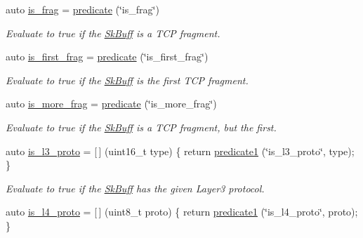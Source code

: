 \begin{DoxyCompactItemize}
auto \hyperlink{namespacepfq_1_1lang_1_1anonymous__namespace_02default_8hpp_03_af042e092c925ae6306ae85ae5a56563d}{is\+\_\+frag} = \hyperlink{namespacepfq_1_1lang_a6c156f209614d0291b280153416dba97}{predicate} (\char`\"{}is\+\_\+frag\char`\"{})
\begin{DoxyCompactList}\small\item\em Evaluate to {\ttfamily true} if the \hyperlink{structpfq_1_1lang_1_1SkBuff}{Sk\+Buff} is a T\+C\+P fragment. \end{DoxyCompactList}\item 
auto \hyperlink{namespacepfq_1_1lang_1_1anonymous__namespace_02default_8hpp_03_afb797cc442d04e614a9ac68c7c4c35ff}{is\+\_\+first\+\_\+frag} = \hyperlink{namespacepfq_1_1lang_a6c156f209614d0291b280153416dba97}{predicate} (\char`\"{}is\+\_\+first\+\_\+frag\char`\"{})
\begin{DoxyCompactList}\small\item\em Evaluate to {\ttfamily true} if the \hyperlink{structpfq_1_1lang_1_1SkBuff}{Sk\+Buff} is the first T\+C\+P fragment. \end{DoxyCompactList}\item 
auto \hyperlink{namespacepfq_1_1lang_1_1anonymous__namespace_02default_8hpp_03_a0b169afb2f21c8626f06f77ca75feded}{is\+\_\+more\+\_\+frag} = \hyperlink{namespacepfq_1_1lang_a6c156f209614d0291b280153416dba97}{predicate} (\char`\"{}is\+\_\+more\+\_\+frag\char`\"{})
\begin{DoxyCompactList}\small\item\em Evaluate to {\ttfamily true} if the \hyperlink{structpfq_1_1lang_1_1SkBuff}{Sk\+Buff} is a T\+C\+P fragment, but the first. \end{DoxyCompactList}\item 
auto \hyperlink{namespacepfq_1_1lang_1_1anonymous__namespace_02default_8hpp_03_a814bb9c3c833dc2af342d695b1d503e8}{is\+\_\+l3\+\_\+proto} = \mbox{[}$\,$\mbox{]} (uint16\+\_\+t type) \{ return \hyperlink{namespacepfq_1_1lang_a3e018f096545ca95a68e67027c8e3144}{predicate1} (\char`\"{}is\+\_\+l3\+\_\+proto\char`\"{}, type); \}
\begin{DoxyCompactList}\small\item\em Evaluate to {\ttfamily true} if the \hyperlink{structpfq_1_1lang_1_1SkBuff}{Sk\+Buff} has the given Layer3 protocol. \end{DoxyCompactList}\item 
auto \hyperlink{namespacepfq_1_1lang_1_1anonymous__namespace_02default_8hpp_03_a9d06d4dedca1ebdc3b270cb2f3e9e42b}{is\+\_\+l4\+\_\+proto} = \mbox{[}$\,$\mbox{]} (uint8\+\_\+t proto) \{ return \hyperlink{namespacepfq_1_1lang_a3e018f096545ca95a68e67027c8e3144}{predicate1} (\char`\"{}is\+\_\+l4\+\_\+proto\char`\"{}, proto); \}

\end{DoxyCompactItemize}
